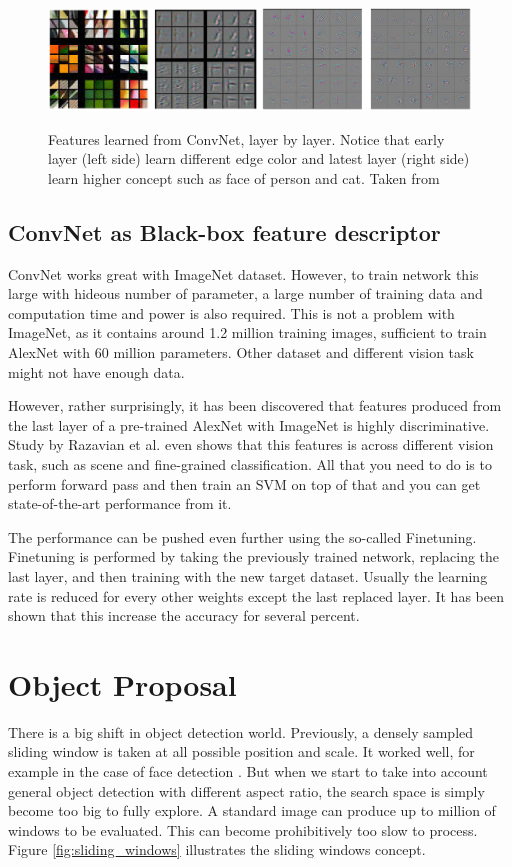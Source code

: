 \documentclass[a4paper,11pt]{kth-mag}
\begin{document}
\begin{figure}[h]
\centering
\includegraphics[scale=0.5]{image/convnet_features.png}
\label{fig:convnet_features}
\caption{Features learned from ConvNet, layer by layer. Notice that early layer (left side) learn different edge color and latest layer (right side) learn higher concept such as face of person and cat. Taken from \cite{zeiler}}
\end{figure}

\subsection{ConvNet as Black-box feature descriptor}
ConvNet works great with ImageNet dataset. However, to train network this large with hideous number of parameter, a large number of training data and computation time and power is also required. This is not a problem with ImageNet, as it contains around 1.2 million training images, sufficient to train AlexNet with 60 million parameters. Other dataset and different vision task might not have enough data.

However, rather surprisingly, it has been discovered that features produced from the last layer of a pre-trained AlexNet with ImageNet is highly discriminative. Study by Razavian et al. \cite{razavian} even shows that this features is across different vision task, such as scene and fine-grained classification. All that you need to do is to perform forward pass and then train an SVM on top of that and you can get state-of-the-art performance from it.

The performance can be pushed even further using the so-called Finetuning. Finetuning is performed by taking the previously trained network, replacing the last layer, and then training with the new target dataset. Usually the learning rate is reduced for every other weights except the last replaced layer. It has been shown that this increase the accuracy for several percent.

\section{Object Proposal}
There is a big shift in object detection world. Previously, a densely sampled sliding window is taken at all possible position and scale. It worked well, for example in the case of face detection \cite{violajones}. But when we start to take into account general object detection with different aspect ratio, the search space is simply become too big to fully explore. A standard image can produce up to million of windows to be evaluated. This can become prohibitively too slow to process. Figure \ref{fig:sliding_windows} illustrates the sliding windows concept.
\end{document}
